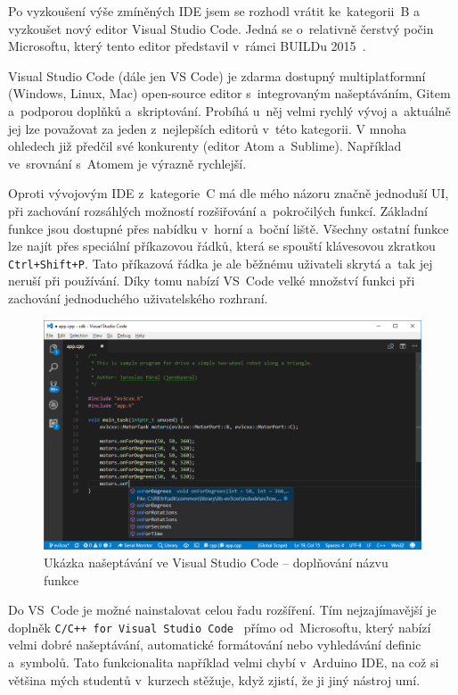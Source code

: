 Po vyzkoušení výše zmíněných IDE jsem se rozhodl vrátit ke~kategorii~B a vyzkoušet nový editor Visual Studio Code. 
Jedná se o~relativně čerstvý počin Microsoftu, který tento editor představil v~rámci BUILDu 2015~\cite{visual-studio-code_initial-release}.


Visual Studio Code (dále jen VS Code) je zdarma dostupný multiplatformní (Windows, Linux, Mac) open-source editor s~integrovaným našeptáváním, Gitem a~podporou doplňků a~skriptování.
Probíhá u~něj velmi rychlý vývoj a~aktuálně jej lze považovat za jeden z~nejlepších editorů v~této kategorii.
V mnoha ohledech již předčil své konkurenty (editor Atom a~Sublime).
Například ve~srovnání s~Atomem je výrazně rychlejší.

Oproti vývojovým IDE z~kategorie~C má dle mého názoru značně jednoduší UI, při zachování rozsáhlých možností rozšiřování a~pokročilých funkcí. 
Základní funkce jsou dostupné přes nabídku v~horní a~boční liště. 
Všechny ostatní funkce lze najít přes speciální příkazovou řádků, která se spouští klávesovou zkratkou \texttt{Ctrl+Shift+P}. 
Tato příkazová řádka je ale běžnému uživateli skrytá a~tak jej neruší při používání.
Díky tomu nabízí VS~Code velké množství funkci při zachování jednoduchého uživatelského rozhraní.

\begin{figure}[h]
    \centering
    \includegraphics[width=\textwidth]{images/visual-studio-code_intellisense-function.png}
    \caption{Ukázka našeptávání ve Visual Studio Code -- doplňování názvu funkce}
    \label{fig:visual-studio-code_intellisense-function}
\end{figure}


Do VS~Code je možné nainstalovat celou řadu rozšíření. 
Tím nejzajímavější je doplněk  \texttt{C/C++ for Visual Studio Code}~\cite{vs-code_cpptools} přímo od~Microsoftu, který nabízí velmi dobré našeptávání, automatické formátování nebo vyhledávání definic a~symbolů.
Tato funkcionalita například velmi chybí v~Arduino IDE, na což si většina mých studentů v~kurzech stěžuje, když zjistí, že ji jiný nástroj umí.

